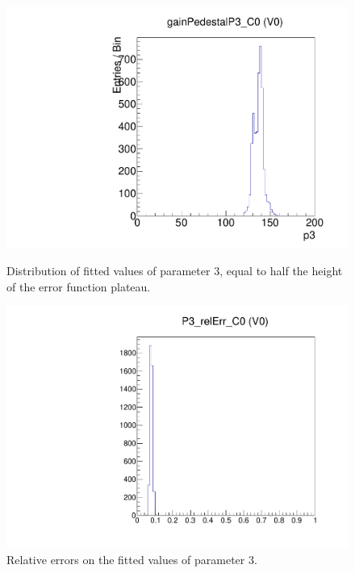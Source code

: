 \begin{figure}[!htp]
\centering
\begin{minipage}{0.45\textwidth}
  \includegraphics[width=1.0\textwidth]{figures/gainped_gainPedestalP3.pdf}
  \caption{Distribution of fitted values of parameter 3, equal to half the height of the error function plateau.}
  \label{fig:gainped_gainPedestalP3}
\end{minipage}
\hspace{0.3cm}
\begin{minipage}{0.45\textwidth}
  \includegraphics[width=1.0\textwidth]{figures/gainped_P3_relErr.pdf}
  \caption{Relative errors on the fitted values of parameter 3.}
  \label{fig:gainped_P3_relErr}
\end{minipage}
\end{figure}

